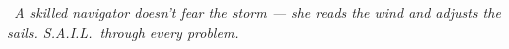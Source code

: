 {%
\begin{tcolorbox}[
    enhanced,
    colback=navWave,
    colframe=navTeal!25,
    arc=6pt, boxrule=0.8pt,
    left=5mm, right=5mm, top=3mm, bottom=3mm,
]
    \begin{minipage}[c]{0.07\linewidth}
        \centering \iconOwl[1cm]
    \end{minipage}%
    \hfill
    \begin{minipage}[c]{0.90\linewidth}
        \small\itshape\color{navDeep}
        \faQuoteLeft~A skilled navigator doesn't fear the storm ---
        she reads the wind and adjusts the sails.
        S.A.I.L.\ through every problem.~\faQuoteRight
    \end{minipage}
\end{tcolorbox}

}

\newpage
